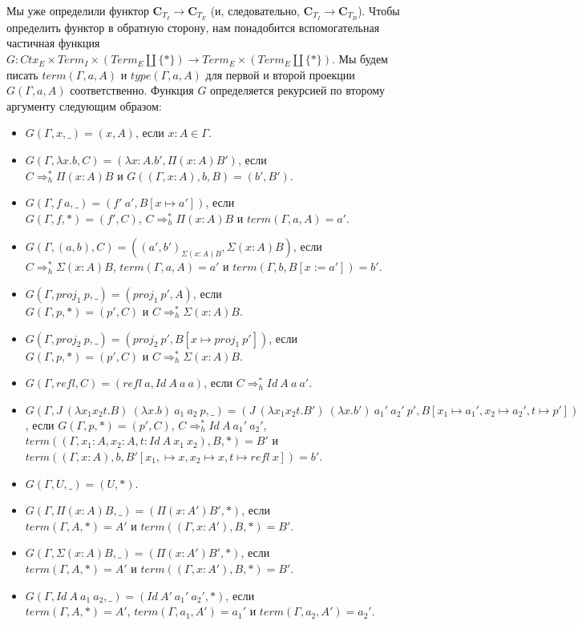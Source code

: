 \documentclass{amsart}
\theoremstyle{definition}
\theoremstyle{remark}
\newcommand{\red}{\Rightarrow}
\newcommand{\cat}[1]{\mathbf{#1}}
\renewcommand{\C}{\cat{C}}
\numberwithin{figure}{section}
\begin{document}
Мы уже определили функтор $\C_{T_I} \to \C_{T_E}$ (и, следовательно, $\C_{T_I} \to \C_{T_B}$).
Чтобы определить функтор в обратную сторону, нам понадобится вспомогательная частичная функция $G : Ctx_E \times Term_I \times (Term_E \amalg \{ * \}) \to Term_E \times (Term_E \amalg \{ * \})$.
Мы будем писать $term(\Gamma, a, A)$ и $type(\Gamma, a, A)$ для первой и второй проекции $G(\Gamma, a, A)$ соответственно.
Функция $G$ определяется рекурсией по второму аргументу следующим образом:
\begin{itemize}
\item $G(\Gamma, x, \_) = (x, A)$, если $x : A \in \Gamma$.
\item $G(\Gamma, \lambda x. b, C) = (\lambda x : A. b', \Pi (x : A) B')$, если \\
    $C \red_h^* \Pi (x : A) B$ и $G((\Gamma, x : A), b, B) = (b', B')$.
\item $G(\Gamma, f\ a, \_) = (f'\ a', B[x \mapsto a'])$, если \\
    $G(\Gamma, f, *) = (f', C)$, $C \red_h^* \Pi (x : A) B$ и $term(\Gamma, a, A) = a'$.
\item $G(\Gamma, (a, b), C) = ((a', b')_{\Sigma (x : A) B}, \Sigma (x : A) B)$, если \\
    $C \red_h^* \Sigma (x : A) B$, $term(\Gamma, a, A) = a'$ и $term(\Gamma, b, B[x := a']) = b'$.
\item $G(\Gamma, proj_1\ p, \_) = (proj_1\ p', A)$, если \\
    $G(\Gamma, p, *) = (p', C)$ и $C \red_h^* \Sigma (x : A) B$.
\item $G(\Gamma, proj_2\ p, \_) = (proj_2\ p', B[x \mapsto proj_1\ p'])$, если \\
    $G(\Gamma, p, *) = (p', C)$ и $C \red_h^* \Sigma (x : A) B$.
\item $G(\Gamma, refl, C) = (refl\ a, Id\ A\ a\ a)$, если $C \red_h^* Id\ A\ a\ a'$.
\item $G(\Gamma, J\ (\lambda x_1 x_2 t. B)\ (\lambda x. b)\ a_1\ a_2\ p, \_) = (J\ (\lambda x_1 x_2 t. B')\ (\lambda x. b')\ a_1'\ a_2'\ p', B[x_1 \mapsto a_1', x_2 \mapsto a_2', t \mapsto p'])$, если
    $G(\Gamma, p, *) = (p', C)$,
    $C \red_h^* Id\ A\ a_1'\ a_2'$, \\
    $term((\Gamma, x_1 : A, x_2 : A, t : Id\ A\ x_1\ x_2), B, *) = B'$ и \\
    $term((\Gamma, x : A), b, B'[x_1, \mapsto x, x_2 \mapsto x, t \mapsto refl\ x]) = b'$.
\item $G(\Gamma, U, \_) = (U, *)$.
\item $G(\Gamma, \Pi (x : A) B, \_) = (\Pi (x : A') B', *)$, если \\
    $term(\Gamma, A, *) = A'$ и $term((\Gamma, x : A'), B, *) = B'$.
\item $G(\Gamma, \Sigma (x : A) B, \_) = (\Pi (x : A') B', *)$, если \\
    $term(\Gamma, A, *) = A'$ и $term((\Gamma, x : A'), B, *) = B'$.
\item $G(\Gamma, Id\ A\ a_1\ a_2, \_) = (Id\ A'\ a_1'\ a_2', *)$, если \\
    $term(\Gamma, A, *) = A'$, $term(\Gamma, a_1, A') = a_1'$ и $term(\Gamma, a_2, A') = a_2'$.
\end{itemize}
\end{document}
